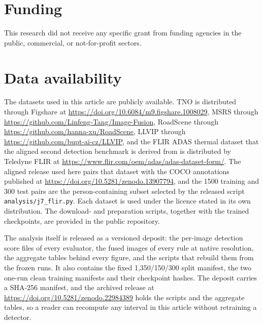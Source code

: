\documentclass[journal]{IEEEtran}
\begin{document}
\section*{Funding}
This research did not receive any specific grant from funding agencies in the
public, commercial, or not-for-profit sectors.

\section*{Data availability}
\begin{sloppypar}
The datasets used in this article are publicly available. TNO is distributed through
Figshare at \url{https://doi.org/10.6084/m9.figshare.1008029}, MSRS through
\url{https://github.com/Linfeng-Tang/Image-Fusion}, RoadScene through
\url{https://github.com/hanna-xu/RoadScene}, LLVIP through
\url{https://github.com/bupt-ai-cz/LLVIP}, and the FLIR ADAS thermal dataset that the
aligned second detection benchmark is derived from is distributed by Teledyne FLIR at
\url{https://www.flir.com/oem/adas/adas-dataset-form/}. The aligned release used here
pairs that dataset with the COCO annotations published at
\url{https://doi.org/10.5281/zenodo.13907794}, and the 1500 training and 300 test pairs
are the person-containing subset selected by the released script
\texttt{analysis/j7\_flir.py}. Each dataset is used under the licence stated in its own
distribution. The
download- and preparation scripts, together with the trained checkpoints, are provided
in the public repository.
\end{sloppypar}

\begin{sloppypar}
The analysis itself is released as a versioned deposit: the per-image detection score
files of every evaluator, the fused images of every rule at native resolution, the
aggregate tables behind every figure, and the scripts that rebuild them from the frozen
runs. It also contains the fixed 1,350/150/300 split manifest, the two one-run clean
training manifests and their checkpoint hashes. The deposit carries a SHA-256 manifest, and the archived release at
\url{https://doi.org/10.5281/zenodo.22984389} holds the scripts and the aggregate tables,
so a reader can recompute any interval in this article without retraining a detector.
\end{sloppypar}
\end{document}
